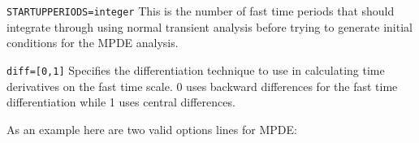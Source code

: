\begin{XyceItemize}
\item \texttt{STARTUPPERIODS=integer}  This is the number of fast time
periods that \Xyce{} should integrate through using normal transient analysis
before trying to generate initial conditions for the MPDE analysis. 

\item \texttt{diff=[0,1]}  Specifies the differentiation technique to use in 
calculating time derivatives on the fast time scale.  0 uses backward 
differences for the fast time differentiation while 1 uses central differences.

\end{XyceItemize}

As an example here are two valid options lines for MPDE:





